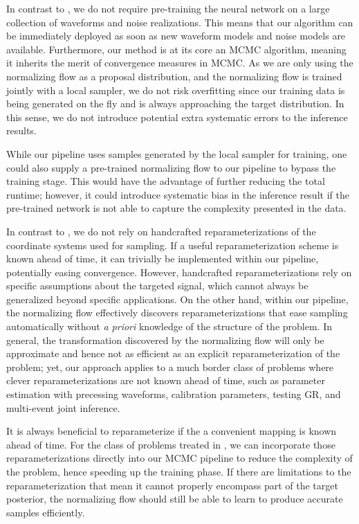 \documentclass[twocolumn]{aastex631}
\begin{document}
In contrast to \cite{Dax:2021tsq,Dax:2022pxd}, we do not require pre-training
the neural network on a large collection of waveforms and noise realizations.
This means that our algorithm can be immediately deployed as soon as new
waveform models and noise models are available. Furthermore, our method is at
its core an MCMC algorithm, meaning it inherits the merit of convergence
measures in MCMC. As we are only using the normalizing flow as a proposal
distribution, and the normalizing flow is trained jointly with a local sampler,
we do not risk overfitting since our training data is being generated on the
fly and is always approaching the target distribution. In this sense, we do not
introduce potential extra systematic errors to the inference results.

While our pipeline uses samples generated by the local sampler for training,
one could also supply a pre-trained normalizing flow to our pipeline to bypass
the training stage. This would have the advantage of further reducing the total
runtime; however, it could introduce systematic bias in the inference result if
the pre-trained network is not able to capture the complexity presented in the
data.

In contrast to \cite{Islam:2022afg,Roulet:2022kot}, we do not rely on
handcrafted reparameterizations of the coordinate systems used for sampling. If
a useful reparameterization scheme is known ahead of time, it can trivially
be implemented within our pipeline, potentially easing convergence. However,
handcrafted reparameterizations rely on specific assumptions about the targeted
signal, which cannot always be generalized beyond specific applications. On the
other hand, within our pipeline, the normalizing flow effectively discovers
reparameterizations that ease sampling automatically without \emph{a priori}
knowledge of the structure of the problem. In general, the transformation
discovered by the normalizing flow will only be approximate and hence not as
efficient as an explicit reparameterization of the problem; yet, our approach
applies to a much border class of problems where clever reparameterizations are
not known ahead of time, such as parameter estimation with precessing
waveforms, calibration parameters, testing GR, and multi-event joint inference.

It is always beneficial to reparameterize if the a convenient mapping is known
ahead of time. For the class of problems treated in
\cite{Islam:2022afg,Roulet:2022kot}, we can incorporate those
reparameterizations directly into our MCMC pipeline to reduce the complexity of
the problem, hence speeding up the training phase. If there are limitations to
the reparameterization that mean it cannot properly encompass part of the
target posterior, the normalizing flow should still be able to learn to produce
accurate samples efficiently.
\end{document}
